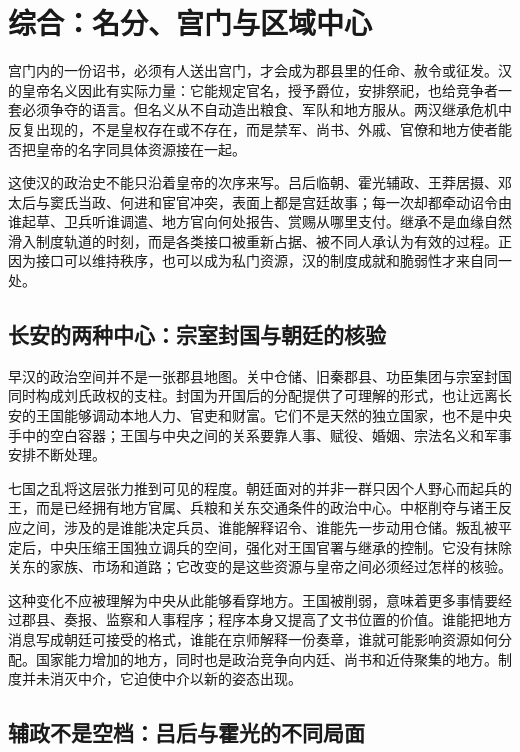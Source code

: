 \section{综合：名分、宫门与区域中心}
\label{sec:synthesis-legitimacy-regions}

宫门内的一份诏书，必须有人送出宫门，才会成为郡县里的任命、赦令或征发。汉的皇帝名义因此有实际力量：它能规定官名，授予爵位，安排祭祀，也给竞争者一套必须争夺的语言。但名义从不自动造出粮食、军队和地方服从。两汉继承危机中反复出现的，不是皇权存在或不存在，而是禁军、尚书、外戚、官僚和地方使者能否把皇帝的名字同具体资源接在一起。

这使汉的政治史不能只沿着皇帝的次序来写。吕后临朝、霍光辅政、王莽居摄、邓太后与窦氏当政、何进和宦官冲突，表面上都是宫廷故事；每一次却都牵动诏令由谁起草、卫兵听谁调遣、地方官向何处报告、赏赐从哪里支付。继承不是血缘自然滑入制度轨道的时刻，而是各类接口被重新占据、被不同人承认为有效的过程。正因为接口可以维持秩序，也可以成为私门资源，汉的制度成就和脆弱性才来自同一处。

\subsection{长安的两种中心：宗室封国与朝廷的核验}

早汉的政治空间并不是一张郡县地图。关中仓储、旧秦郡县、功臣集团与宗室封国同时构成刘氏政权的支柱。封国为开国后的分配提供了可理解的形式，也让远离长安的王国能够调动本地人力、官吏和财富。它们不是天然的独立国家，也不是中央手中的空白容器；王国与中央之间的关系要靠人事、赋役、婚姻、宗法名义和军事安排不断处理。

七国之乱将这层张力推到可见的程度。朝廷面对的并非一群只因个人野心而起兵的王，而是已经拥有地方官属、兵粮和关东交通条件的政治中心。中枢削夺与诸王反应之间，涉及的是谁能决定兵员、谁能解释诏令、谁能先一步动用仓储。叛乱被平定后，中央压缩王国独立调兵的空间，强化对王国官署与继承的控制。它没有抹除关东的家族、市场和道路；它改变的是这些资源与皇帝之间必须经过怎样的核验。

这种变化不应被理解为中央从此能够看穿地方。王国被削弱，意味着更多事情要经过郡县、奏报、监察和人事程序；程序本身又提高了文书位置的价值。谁能把地方消息写成朝廷可接受的格式，谁能在京师解释一份奏章，谁就可能影响资源如何分配。国家能力增加的地方，同时也是政治竞争向内廷、尚书和近侍聚集的地方。制度并未消灭中介，它迫使中介以新的姿态出现。

\subsection{辅政不是空档：吕后与霍光的不同局面}

